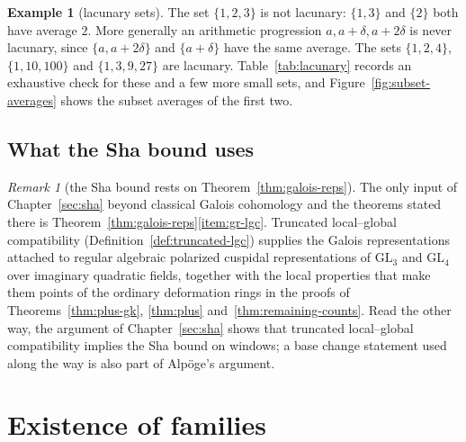 \documentclass[11pt]{amsbook}
\theoremstyle{plain}
\theoremstyle{definition}
\newtheorem{example}[theorem]{Example}
\theoremstyle{remark}
\newtheorem{remark}[theorem]{Remark}
\numberwithin{equation}{section}
\numberwithin{figure}{chapter}
\numberwithin{table}{chapter}
\begin{document}
\begin{example}[lacunary sets]\label{ex:lacunary}
The set $\{1,2,3\}$ is not lacunary: $\{1,3\}$ and $\{2\}$ both have
average $2$. More generally an arithmetic progression
$a,a+\delta,a+2\delta$ is never lacunary, since $\{a,a+2\delta\}$ and
$\{a+\delta\}$ have the same average. The sets $\{1,2,4\}$,
$\{1,10,100\}$ and $\{1,3,9,27\}$ are lacunary. Table~\ref{tab:lacunary}
records an exhaustive check for these and a few more small sets, and Figure~\ref{fig:subset-averages} shows the subset averages of the first two.
\end{example}

\begin{table}[htbp]
\centering

\caption{A finite set $J$ is lacunary if no two disjoint nonempty
subsets of $J$ have equal averages (Definition~\ref{def:lacunary}),
the condition on the Hodge--Tate weights in
Proposition~\ref{prop:compact-group}. Exhaustive check for small sets.
Arithmetic progressions of length at least $3$ are never lacunary.}
\label{tab:lacunary}
\end{table}

\section{What the Sha bound uses}

\begin{remark}[the Sha bound rests on Theorem~\ref{thm:galois-reps}]
\label{thm:lgc-to-sha}
The only input of Chapter~\ref{sec:sha} beyond classical Galois
cohomology and the theorems stated there is
Theorem~\ref{thm:galois-reps}\ref{item:gr-lgc}. Truncated
local--global compatibility (Definition~\ref{def:truncated-lgc})
supplies the Galois representations attached to regular algebraic
polarized cuspidal representations of $\mathrm{GL}_3$ and
$\mathrm{GL}_4$ over imaginary quadratic fields, together with the
local properties that make them points of the ordinary deformation
rings in the proofs of Theorems~\ref{thm:plus-gk}, \ref{thm:plus}
and~\ref{thm:remaining-counts}. Read the other way, the argument of
Chapter~\ref{sec:sha} shows that truncated local--global
compatibility implies the Sha bound on windows; a base change
statement used along the way is also part of Alp\"oge's argument.
\end{remark}

\clearpage
\clearpage
\chapter{Existence of families}
\label{ch:families}\label{sec:assembly}
\end{document}
